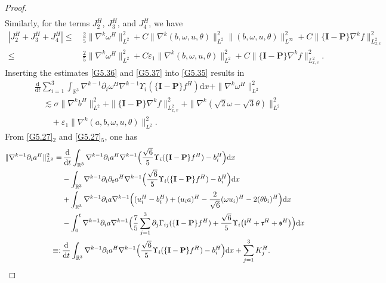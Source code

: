 \documentclass[reqno,11pt]{amsart}
\theoremstyle{plain}
\numberwithin{equation}{section}
\newcommand{\eps}{{\varepsilon}}
\begin{document}
\begin{proof}
\begin{align}
\end{align}
Similarly, for the terms $J_2^H$, $J_3^H$, and $J_4^H$, we have   %
\begin{align}\label{G5.37}
 |J_2^H+J_3^H+J_4^H| \leq&\, \frac{2}{5}\|\nabla^k \omega^H\|_{L^2}^2+C\|\nabla^k ( b,\omega,u,\theta)\|_{L^2}^2\|( b,\omega,u,\theta)\|_{L^\infty}^2+C \|\{\mathbf{I}-\mathbf{P}\} \nabla^k f\|_{L_{x,v}^2  }^2\nonumber\\
\leq&\,\frac{2}{5}\|\nabla^k \omega^H\|_{L^2}^2+C\eps_1\|\nabla^k ( b,\omega,u,\theta)\|_{L^2}^2+C\|\{\mathbf{I}-\mathbf{P}\} \nabla^k f\|_{L_{x,v}^2  }^2.
\end{align}
Inserting the estimates \eqref{G5.36} and \eqref{G5.37} into \eqref{G5.35} results in  
\begin{align}\label{G5.38}
& \frac{\mathrm{d}}{\mathrm{d} t}  \sum_{ i=1}^3 \int_{\mathbb{R}^3} \nabla^{k-1} \partial_i \omega^H \nabla^{k-1} \Upsilon_i(\{\mathbf{I}-\mathbf{P}\} f ^H)\mathrm{d} x+  \|\nabla^{k}  \omega^H \|_{L^2}^2 \nonumber\\
&\quad \lesssim  \sigma\|\nabla^k b^H\|_{L^2}^2+ \|\{\mathbf{I}-\mathbf{P}\} \nabla^k f\|_{L_{x,v}^2}^2+ \|\nabla^k(\sqrt{2} \omega-\sqrt{3} \theta)\|_{L^2}^2\nonumber\\
& \qquad +\eps_1\|\nabla^k(a,b,\omega,u,\theta)\|_{L^2}^2. 
\end{align}
From \eqref{G5.27}$_2$ and \eqref{G5.27}$_5$, one has
\begin{align}\label{G5.39}
\|\nabla^{k-1} \partial_i a^H \|_{L^2}^2=&\, \frac{\mathrm{d}}{\mathrm{d} t} \int_{\mathbb{R}^3} \nabla^{k-1} \partial_i a^H \nabla^{k-1}\Big(\frac{\sqrt{6}}{5} \Upsilon_i(\{\mathbf{I}-\mathbf{P}\} f^H)-b^H_i\Big) \mathrm{d} x \nonumber\\
& -\int_{\mathbb{R}^3} \nabla^{k-1} \partial_i\partial_t a^H \nabla^{k-1}\Big(\frac{\sqrt{6}}{5} \Upsilon_i(\{\mathbf{I}-\mathbf{P}\} f^H)-b^H_i\Big) \mathrm{d} x \nonumber\\
& +\int_{\mathbb{R}^3} \nabla^{k-1} \partial_i a \nabla^{k-1}\Big( (u^H_i-b^H_i)+(u_i a)^H-\frac{2}{\sqrt{6}} (\omega u_i)^H-2 (\theta b_i)^H\Big){\rm d}x\nonumber \\
& -\int_0^t \nabla^{k-1} \partial_i a \nabla^{k-1}\Big( \frac{7}{5} \sum_{j=1}^3 \partial_j \Gamma_{i j}(\{\mathbf{I}-\mathbf{P}\} f^H)+\frac{\sqrt{6}}{5} \Upsilon_i\big(\mathfrak{l}^H+\mathfrak{r}^H+\mathfrak{s}^H\big)\Big) \mathrm{d}x \nonumber\\
\equiv:\,&\frac{\mathrm{d}}{\mathrm{d} t} \int_{\mathbb{R}^3} \nabla^{k-1} \partial_i a^H \nabla^{k-1}\Big(\frac{\sqrt{6}}{5} \Upsilon_i(\{\mathbf{I}-\mathbf{P}\} f^H)-b^H_i\Big) \mathrm{d} x+\sum_{j=1}^3 K_j^H.

\end{align}
\end{proof}
\end{document}
